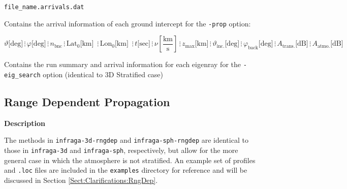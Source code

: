 \documentclass[10pt]{article}
\begin{document}
	\verb=file_name.arrivals.dat=
	
	Contains the arrival information of each ground intercept for the \verb=-prop= option:
	\begin{small}
	\begin{equation*}
	\vartheta \text{[deg]} \hspace{2pt} \vdots \hspace{2pt} 
	\varphi \text{[deg]} \hspace{2pt} \vdots \hspace{2pt} 
	n_\text{bnc} \hspace{2pt} \vdots \hspace{2pt}
	\text{Lat}_0 \text{[km] } \hspace{2pt} \vdots \hspace{2pt}  
	\text{Lon}_0 \text{[km] } \hspace{2pt} \vdots \hspace{2pt}  
	t \text{[sec]} \hspace{2pt} \vdots \hspace{2pt} 
	\nu \left[ \frac{\text{km}}{\text{s}}\right] \hspace{2pt} \vdots \hspace{2pt}
	z_\text{max} \text{[km]} \hspace{2pt} \vdots \hspace{2pt} 
	\vartheta_\text{inc.} \text{[deg]} \hspace{2pt} \vdots \hspace{2pt}
	\varphi_\text{back} \text{[deg]} \hspace{2pt} \vdots \hspace{2pt}
	A_\text{trans.} \text{[dB]} \hspace{2pt} \vdots \hspace{2pt}
	A_\text{atmo.} \text{[dB]}	
	\end{equation*}
	\end{small}

	 Contains the run summary and arrival information for each eigenray for the \verb=-eig_search= option (identical to 3D Stratified case)

\subsection{Range Dependent Propagation}
\label{Sect:Usage:RngDep}
\textbf{Description}  

The methods in \verb=infraga-3d-rngdep= and \verb=infraga-sph-rngdep= are identical to those in \verb=infraga-3d= and \verb=infraga-sph=, respectively, but allow for the more general case in which the atmosphere is not stratified.   An example set of profiles and \verb=.loc= files are included in the \verb=examples= directory for reference and will be discussed in Section \ref{Sect:Clarifications:RngDep}.
\end{document}
